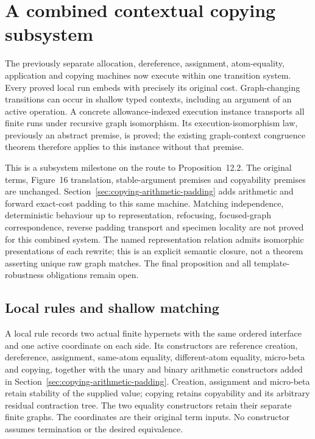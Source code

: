 \clearpage
\section{A combined contextual copying subsystem}
\label{sec:copying-combined}
The previously separate allocation, dereference, assignment, atom-equality,
application and copying machines now execute within one transition system.
Every proved local run embeds with precisely its original cost. Graph-changing
transitions can occur in shallow typed contexts, including an argument of an
active operation. A concrete allowance-indexed execution instance transports
all finite runs under recursive graph isomorphism. Its execution-isomorphism
law, previously an abstract premise, is proved; the existing graph-context
congruence theorem therefore applies to this instance without that premise.

This is a subsystem milestone on the route to Proposition~12.2. The original
terms, Figure~16 translation, stable-argument premises and copyability premises
are unchanged. Section~\ref{sec:copying-arithmetic-padding} adds arithmetic and
forward exact-cost padding to this same machine. Matching independence, deterministic
behaviour up to representation, refocusing, focused-graph correspondence,
reverse padding transport and specimen locality are not proved for this combined
system. The named representation relation admits isomorphic presentations of
each rewrite; this is an explicit semantic closure, not a theorem asserting
unique raw graph matches. The final proposition and all template-robustness
obligations remain open.

\subsection{Local rules and shallow matching}

A local rule records two actual finite hypernets with the same ordered
interface and one active coordinate on each side. Its constructors are reference creation, dereference, assignment, same-atom
equality, different-atom equality, micro-beta and copying, together with the
unary and binary arithmetic constructors added in
Section~\ref{sec:copying-arithmetic-padding}. Creation, assignment and
micro-beta retain stability of the supplied value; copying retains copyability
and its arbitrary residual contraction tree. The two equality constructors
retain their separate finite graphs. The coordinates are their original term
inputs. No constructor assumes termination or the desired equivalence.


